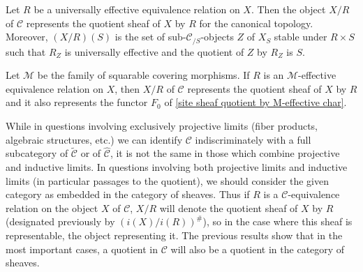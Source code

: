 \begin{corollary}
Let $R$ be a universally effective equivalence relation on $X$. Then the object $X/R$ of $\mathcal{C}$ represents the quotient sheaf of $X$ by $R$ for the canonical topology. Moreover, $(X/R)(S)$ is the set of sub-$\mathcal{C}_{/S}$-objects $Z$ of $X_S$ stable under $R\times S$ such that $R_Z$ is universally effective and the quotient of $Z$ by $R_Z$ is $S$.
\end{corollary}

\begin{corollary}
Let $\mathcal{M}$ be the family of squarable covering morphisms. If $R$ is an $\mathcal{M}$-effective equivalence relation on $X$, then $X/R$ of $\mathcal{C}$ represents the quotient sheaf of $X$ by $R$ and it also represents the functor $F_0$ of \cref{site sheaf quotient by M-effective char}.
\end{corollary}

While in questions involving exclusively projective limits (fiber products, algebraic structures, etc.) we can identify $\mathcal{C}$ indiscriminately with a full subcategory of $\widetilde{\mathcal{C}}$ or of $\widehat{\mathcal{C}}$, it is not the same in those which combine projective and inductive limits. In questions involving both projective limits and inductive limits (in particular passages to the quotient), we should consider the given category as embedded in the category of sheaves. Thus if $R$ is a $\mathcal{C}$-equivalence relation on the object $X$ of $\mathcal{C}$, $X/R$ will denote the quotient sheaf of $X$ by $R$ (designated previously by $(i(X)/i(R))^\#$), so in the case where this sheaf is representable, the object representing it. The previous results show that in the most important cases, a quotient in $\mathcal{C}$ will also be a quotient in the category of sheaves.\par

